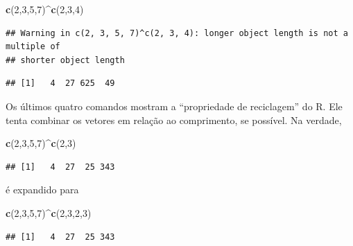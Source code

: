\documentclass[
]{book}
\newenvironment{Shaded}{\begin{snugshade}}{\end{snugshade}}
\newcommand{\DecValTok}[1]{\textcolor[rgb]{0.00,0.00,0.81}{#1}}
\newcommand{\FunctionTok}[1]{\textcolor[rgb]{0.13,0.29,0.53}{\textbf{#1}}}
\newcommand{\NormalTok}[1]{#1}
\newcommand{\SpecialCharTok}[1]{\textcolor[rgb]{0.81,0.36,0.00}{\textbf{#1}}}
\theoremstyle{definition}
\theoremstyle{definition}
\theoremstyle{definition}
\theoremstyle{definition}
\theoremstyle{remark}
\begin{document}
\begin{Shaded}
\begin{Highlighting}[]
\FunctionTok{c}\NormalTok{(}\DecValTok{2}\NormalTok{,}\DecValTok{3}\NormalTok{,}\DecValTok{5}\NormalTok{,}\DecValTok{7}\NormalTok{)}\SpecialCharTok{\^{}}\FunctionTok{c}\NormalTok{(}\DecValTok{2}\NormalTok{,}\DecValTok{3}\NormalTok{,}\DecValTok{4}\NormalTok{)}
\end{Highlighting}
\end{Shaded}

\begin{verbatim}
## Warning in c(2, 3, 5, 7)^c(2, 3, 4): longer object length is not a multiple of
## shorter object length
\end{verbatim}

\begin{verbatim}
## [1]   4  27 625  49
\end{verbatim}

Os últimos quatro comandos mostram a ``propriedade de reciclagem'' do R. Ele tenta combinar os vetores em relação ao comprimento, se possível. Na verdade,

\begin{Shaded}
\begin{Highlighting}[]
\FunctionTok{c}\NormalTok{(}\DecValTok{2}\NormalTok{,}\DecValTok{3}\NormalTok{,}\DecValTok{5}\NormalTok{,}\DecValTok{7}\NormalTok{)}\SpecialCharTok{\^{}}\FunctionTok{c}\NormalTok{(}\DecValTok{2}\NormalTok{,}\DecValTok{3}\NormalTok{)}
\end{Highlighting}
\end{Shaded}

\begin{verbatim}
## [1]   4  27  25 343
\end{verbatim}

é expandido para

\begin{Shaded}
\begin{Highlighting}[]
\FunctionTok{c}\NormalTok{(}\DecValTok{2}\NormalTok{,}\DecValTok{3}\NormalTok{,}\DecValTok{5}\NormalTok{,}\DecValTok{7}\NormalTok{)}\SpecialCharTok{\^{}}\FunctionTok{c}\NormalTok{(}\DecValTok{2}\NormalTok{,}\DecValTok{3}\NormalTok{,}\DecValTok{2}\NormalTok{,}\DecValTok{3}\NormalTok{)}
\end{Highlighting}
\end{Shaded}

\begin{verbatim}
## [1]   4  27  25 343
\end{verbatim}
\end{document}
